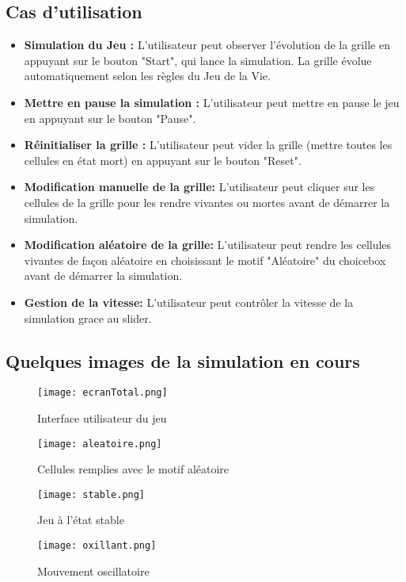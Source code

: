 \documentclass[a4paper,12pt]{article}
\begin{document}
    \subsection{Cas d'utilisation}
    \begin{itemize}
        \item \textbf{Simulation du Jeu :} L'utilisateur peut observer l'évolution de la grille en appuyant sur le bouton "Start", qui lance la simulation. La grille évolue automatiquement selon les règles du Jeu de la Vie.\\
        \item \textbf{Mettre en pause la simulation :} L'utilisateur peut mettre en pause le jeu en appuyant sur le bouton "Pause".\\
          \item \textbf{Réinitialiser la grille :} L'utilisateur peut vider la grille (mettre toutes les cellules en état mort) en appuyant sur le bouton "Reset".\\
         \item \textbf{Modification manuelle de la grille:} L'utilisateur peut cliquer sur les cellules de la grille pour les rendre vivantes ou mortes avant de démarrer la simulation.\\
         \item \textbf{Modification aléatoire de la grille:} L'utilisateur peut rendre les cellules vivantes de façon aléatoire en choisissant le motif "Aléatoire" du choicebox avant de démarrer la simulation.\\
         \item \textbf{Gestion de la vitesse:} L'utilisateur peut contrôler la vitesse de la simulation grace au slider.
    \end{itemize}
    \subsection{Quelques images de la simulation en cours}
    \begin{figure}[H]
        \centering
        \texttt{[image: ecranTotal.png]}
        \caption{Interface utilisateur du jeu}
    \end{figure}
    \begin{figure}[H]
        \centering
        \texttt{[image: aleatoire.png]}
        \caption{Cellules remplies avec le motif aléatoire}
    \end{figure}
    \begin{figure}[H]
        \centering
        \texttt{[image: stable.png]}
        \caption{Jeu à l'état stable}
    \end{figure}
    \begin{figure}[H]
        \centering
        \texttt{[image: oxillant.png]}
        \caption{Mouvement oscillatoire}
    \end{figure}
\end{document}
